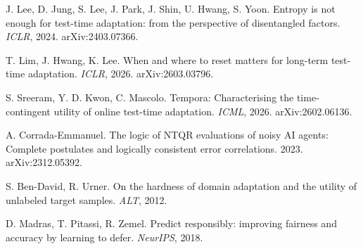  J. Lee, D. Jung, S. Lee, J. Park, J. Shin, U. Hwang, S. Yoon.
Entropy is not enough for test-time adaptation: from the perspective of disentangled
factors. \emph{ICLR}, 2024. arXiv:2403.07366.

 T. Lim, J. Hwang, K. Lee. When and where to reset matters for
long-term test-time adaptation. \emph{ICLR}, 2026. arXiv:2603.03796.

 S. Sreeram, Y. D. Kwon, C. Mascolo.
Tempora: Characterising the time-contingent utility of online test-time adaptation.
\emph{ICML}, 2026. arXiv:2602.06136.

 A. Corrada-Emmanuel. The logic of NTQR evaluations of
noisy AI agents: Complete postulates and logically consistent error correlations.
2023. arXiv:2312.05392.

 S. Ben-David, R. Urner. On the hardness of domain
adaptation and the utility of unlabeled target samples. \emph{ALT}, 2012.

 D. Madras, T. Pitassi, R. Zemel. Predict responsibly:
improving fairness and accuracy by learning to defer. \emph{NeurIPS}, 2018.
